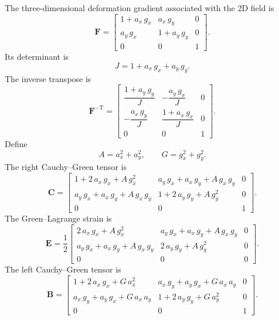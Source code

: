 \documentclass[11pt,a4paper]{article}
\begin{document}
The three-dimensional deformation gradient associated with the 2D field is
%
\begin{equation}
\boxed{
\textbf{F}=
\begin{bmatrix}
1+a_x\,g_x&a_x\,g_y&0\\
a_y\,g_x&1+a_y\,g_y&0\\
0&0&1
\end{bmatrix}
}.
\label{eq_F2D}
\end{equation}
%
Its determinant is
%
\begin{equation}
\boxed{J=1+a_x\,g_x+a_y\,g_y}.
\label{eq_J2D}
\end{equation}
%
The inverse transpose is
%
\begin{equation}
\boxed{
\textbf{F}^{-\text{T}}=
\begin{bmatrix}
\dfrac{1+a_y\,g_y}{J}&-\dfrac{a_y\,g_x}{J}&0\\[1.3ex]
-\dfrac{a_x\,g_y}{J}&\dfrac{1+a_x\,g_x}{J}&0\\[1.3ex]
0&0&1
\end{bmatrix}
}.
\label{eq_FinvT2D}
\end{equation}
%
Define
%
\begin{equation}
A=a_x^2+a_y^2,
\qquad
G=g_x^2+g_y^2.
\end{equation}
%
The right Cauchy--Green tensor is
%
\begin{equation}
\boxed{
\textbf{C}=
\begin{bmatrix}
1+2\,a_x\,g_x+A\,g_x^2&a_y\,g_x+a_x\,g_y+A\,g_x\,g_y&0\\
a_y\,g_x+a_x\,g_y+A\,g_x\,g_y&1+2\,a_y\,g_y+A\,g_y^2&0\\
0&0&1
\end{bmatrix}
}.
\label{eq_C2D}
\end{equation}
%
The Green--Lagrange strain is
%
\begin{equation}
\boxed{
\textbf{E}=\dfrac12
\begin{bmatrix}
2\,a_x\,g_x+A\,g_x^2&a_y\,g_x+a_x\,g_y+A\,g_x\,g_y&0\\
a_y\,g_x+a_x\,g_y+A\,g_x\,g_y&2\,a_y\,g_y+A\,g_y^2&0\\
0&0&0
\end{bmatrix}
}.
\label{eq_E2D}
\end{equation}
%
The left Cauchy--Green tensor is
%
\begin{equation}
\boxed{
\textbf{B}=
\begin{bmatrix}
1+2\,a_x\,g_x+G\,a_x^2&a_x\,g_y+a_y\,g_x+G\,a_x\,a_y&0\\
a_x\,g_y+a_y\,g_x+G\,a_x\,a_y&1+2\,a_y\,g_y+G\,a_y^2&0\\
0&0&1
\end{bmatrix}
}.
\label{eq_B2D}
\end{equation}
\end{document}
